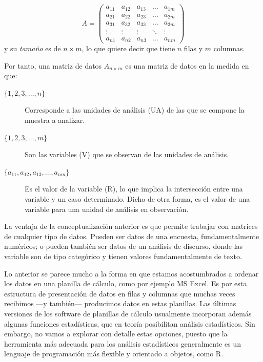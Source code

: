 \documentclass[letterpaper,11pt]{article}
\begin{document}
\begin{equation*}
	A = \begin{pmatrix}
		a_{11} & a_{12} & a_{13} & \ldots & a_{1m}\\
		a_{21} & a_{22} & a_{23} & \ldots & a_{2m}\\
		a_{31} & a_{32} & a_{33} & \ldots & a_{3m}\\
		\vdots & \vdots	& \vdots & \ddots & \vdots \\
		a_{n1} & a_{n2} & a_{n3} & \ldots & a_{nm}
	\end{pmatrix}
\end{equation*}
 y su \emph{tamaño} es de $n\times m$, lo que quiere decir que tiene $n$ filas y $m$ columnas.
 
 Por tanto, una matriz de datos $A_{n\times m}$ es una matriz de datos en la medida en que:
 \begin{description}
		\item[$\{1, 2, 3, \ldots, n\}$] Corresponde a las unidades de análisis (UA) de las que se compone la muestra a analizar.
		\item[$\{1,2,3,\ldots,m\}$] Son las variables (V) que se observan de las unidades de análisis.
		\item[$\{a_{11}, a_{12}, a_{13}, \ldots, a_{nm}\}$] Es el valor de la variable (R), lo que implica la intersección entre una variable y un caso determinado. Dicho de otra forma, es el valor de una variable para una unidad de análisis en observación.
 \end{description} 
 
 La ventaja de la conceptualización anterior es que permite trabajar con matrices de cualquier tipo de datos. Pueden ser datos de  una encuesta, fundamentalmente numéricos; o pueden también ser datos de un análisis de discurso, donde las variable son de tipo categórico y tienen valores fundamentalmente de texto. 
 
 Lo anterior se parece mucho a la forma en que estamos acostumbrados a ordenar los datos en una planilla de cálculo, como por ejemplo MS Excel. Es por esta estructura de presentación de datos en filas y columnas que muchas veces recibimos ---y también--- producimos datos en estas planillas. Las últimas versiones de los software de planillas de cálculo usualmente incorporan además algunas funciones estadísticas, que en teoría posibilitan análisis estadísticos. Sin embargo, no vamos a explorar con detalle estas opciones, puesto que la herramienta más adecuada para los análisis estadísticos generalmente es un lenguaje de programación más flexible y orientado a objetos, como R. 
 
\end{document}
